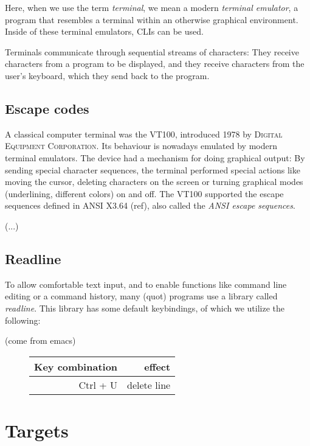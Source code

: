 \documentclass[twoside,parskip]{scrreprt}
\begin{document}
Here, when we use the term \emph{terminal}, we mean a modern \emph{terminal emulator}, a program that resembles a terminal within an otherwise graphical environment. Inside of these terminal emulators, \textsc{CLI}s can be used.

Terminals communicate through sequential streams of characters: They receive characters from a program to be displayed, and they receive characters from the user's keyboard, which they send back to the program.

\subsection{Escape codes}

A classical computer terminal was the \textsc{VT100}, introduced 1978 by \textsc{Digital Equipment Corporation}. Its behaviour is nowadays emulated by modern terminal emulators. The device had a mechanism for doing graphical output: By sending special character sequences, the terminal performed special actions like moving the cursor, deleting characters on the screen or turning graphical modes (underlining, different colors) on and off. The \textsc{VT100} supported the escape sequences defined in ANSI X3.64 (ref), also called the \emph{ANSI escape sequences}.

(...)

\subsection{Readline}

To allow comfortable text input, and to enable functions like command line editing or a command history, many (quot) programs use a library called \emph{readline}. This library has some default keybindings, of which we utilize the following:

(come from emacs)

\begin{figure}
    \begin{tabular}{r|r}
        Key combination & effect \\
        \hline
        Ctrl + U & delete line \\
    \end{tabular}
\end{figure}

\section{Targets}
\end{document}
